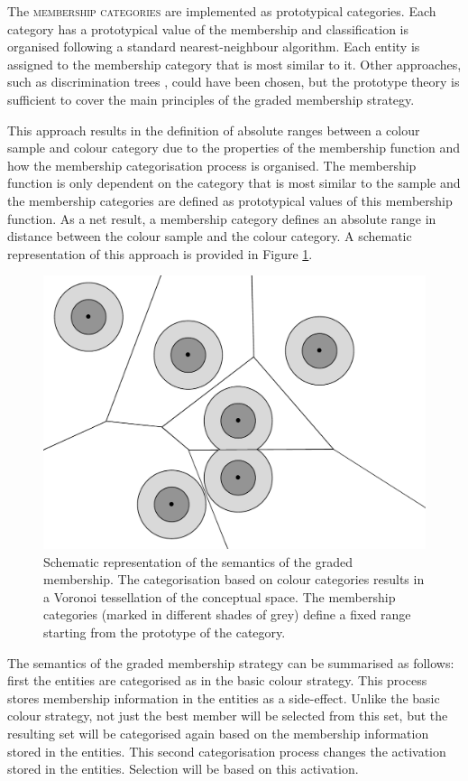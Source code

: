 The \textsc{membership categories} are implemented as prototypical
categories. Each category has a prototypical value of the membership
and classification is organised following a standard nearest-neighbour
algorithm. Each entity is assigned to the membership category that is
most similar to it. Other approaches, such as discrimination trees
\citep{steels96perceptually}, could have been chosen, but the
prototype theory is sufficient to cover the main principles of the
graded membership strategy.

This approach results in the definition of absolute ranges between a
colour sample and colour category due to the properties of the
membership function and how the membership categorisation process is
organised. The membership function is only dependent on the category
that is most similar to the sample and the membership categories are
defined as prototypical values of this membership function. As a net
result, a membership category defines an absolute range in distance
between the colour sample and the colour category. A schematic
representation of this approach is provided in Figure
\ref{f:gms-semantics-schematic}.

\begin{figure}[htbp]
  \centering
  \includegraphics[width=.5\textwidth]{./graded-membership/figures/semantics-schematic.pdf}
  \caption[Schematic representation of the semantics of the graded
  membership strategy]{Schematic representation of the semantics of
    the graded membership. The categorisation based on colour
    categories results in a Voronoi tessellation of the conceptual
    space. The membership categories (marked in different shades of
    grey) define a fixed range starting from the prototype of the
    category.}
  \label{f:gms-semantics-schematic}
\end{figure}

The semantics of the graded membership strategy can be
summarised as follows: first the entities are categorised as in the
basic colour strategy. This process stores membership
information in the entities as a side-effect. Unlike the basic
  colour strategy, not just the best member will be selected from
this set, but the resulting set will be categorised again based on the
membership information stored in the entities. This second
categorisation process changes the activation stored in the
entities. Selection will be based on this activation.

